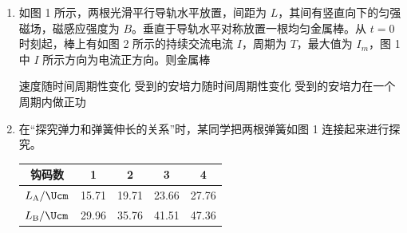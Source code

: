 \documentclass[\gkver]{gaokaozhenti}
\begin{document}
\begin{enumerate}

{当 $\frac{q}{d}=\sqrt{\frac{mg\sin\theta}{k}}$ 时，细线上的拉力为 0}
{当 $\frac{q}{d}=\sqrt{\frac{mg\tan\theta}{k}}$ 时，细线上的拉力为 0}
{当 $\frac{q}{d}=\sqrt{\frac{mg}{k\tan\theta}}$ 时，斜面对小球 A 的支持力为 0}


\item
如图 1 所示，两根光滑平行导轨水平放置，间距为 $L$，其间有竖直向下的匀强磁场，磁感应强度为 $B$。垂直于导轨水平对称放置一根均匀金属棒。从 $t=0$ 时刻起，棒上有如图 2 所示的持续交流电流 $I$，周期为 $T$，最大值为 $I_{m}$，图 1 中 $I$ 所示方向为电流正方向。则金属棒


{速度随时间周期性变化}
{受到的安培力随时间周期性变化}
{受到的安培力在一个周期内做正功}


\item
在“探究弹力和弹簧伸长的关系”时，某同学把两根弹簧如图 1 连接起来进行探究。

\begin{center}
\begin{tabular}{|c|c|c|c|c|}
\hline
钩码数 & 1 & 2 & 3 & 4 \\ \hline
$L_{\mathrm{A}}/\Ucm$ & 15.71 & 19.71 & 23.66 & 27.76 \\ \hline
$L_{\mathrm{B}}/\Ucm$ & 29.96 & 35.76 & 41.51 & 47.36 \\ \hline
\end{tabular}
\end{center}


\end{enumerate}
\end{document}
